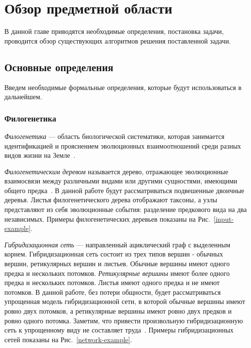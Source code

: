 \FloatBarrier
\chapter{Обзор предметной области}

В данной главе приводятся необходимые определения, постановка задачи, проводится обзор существующих алгоритмов решения поставленной задачи.

\FloatBarrier
\section{Основные определения}

Введем необходимые формальные определения, которые будут использоваться в дальнейшем.

\subsection{Филогенетика}

\emph{Филогенетика} --- область биологической систематики, которая занимается идентификацией и прояснением эволюционных взаимоотношений среди разных видов жизни на Земле~\cite{wiki:phylogenetics}.

\emph{Филогенетическим деревом} называется дерево, отражающее эволюционные взаимосвязи между различными видами или другими сущностями, имеющими общего предка~\cite{wiki:phylogenetic-tree}.
В данной работе будут рассматриваться подвешенные двоичные деревья. Листья филогенетического дерева отображают таксоны, а узлы представляют из себя эволюционные события: разделение предкового вида на два независимых.
Примеры филогенетических деревьев показаны на Рис.~\ref{input-example}.

\emph{Гибридизационная сеть} --- направленный ациклический граф с выделенным корнем.
Гибридизационная сеть состоит из трех типов вершин - обычных вершин, ретикулярных вершин и листьев.
Обычные вершины имеют одного предка и нескольких потомков.
\emph{Ретикулярные вершины} имеют более одного предка и нескольких потомков.
Листья имеют одного предка и не имеют потомков.
В данной работе, без потери общности, будет рассматриваться упрощенная модель гибридизационной сети, в которой обычные вершины имеют ровно двух потомков, а ретикулярные вершины имеют ровно двух предков и ровно одного потомка. 
Заметим, что привести произвольную гибридизационную сеть к упрощенному виду не составляет труда~\cite{wu2010close}.
Примеры гибридизационных сетей показаны на Рис.~\ref{network-example}.

